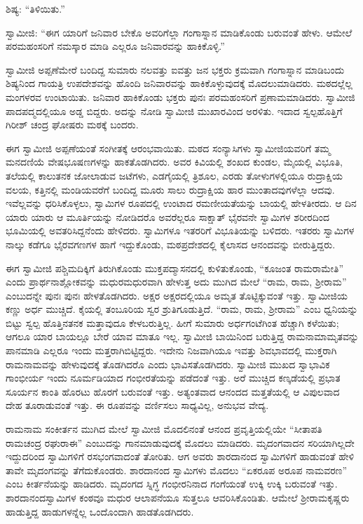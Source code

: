  ಶಿಷ್ಯ: “ತಿಳಿಯಿತು.” 

 ಸ್ವಾಮೀಜಿ: “ಈಗ ಯಾರಿಗೆ ಜನಿವಾರ ಬೇಕೊ ಅವರಿಗೆಲ್ಲಾ ಗಂಗಾಸ್ನಾನ ಮಾಡಿಕೊಂಡು ಬರುವಂತೆ ಹೇಳು. ಆಮೇಲೆ ಪರಮಹಂಸರಿಗೆ ನಮಸ್ಕಾರ ಮಾಡಿ ಎಲ್ಲರೂ ಜನಿವಾರವನ್ನು ಹಾಕಿಕೊಳ್ಳಿ.” 

 ಸ್ವಾಮೀಜಿ ಅಪ್ಪಣೆಮೇರೆ ಬಂದಿದ್ದ ಸುಮಾರು ನಲವತ್ತು ಐವತ್ತು ಜನ ಭಕ್ತರು ಕ್ರಮವಾಗಿ ಗಂಗಾಸ್ನಾನ ಮಾಡಿಬಂದು ಶಿಷ್ಯನಿಂದ ಗಾಯತ್ರಿ ಉಪದೇಶವನ್ನು ಹೊಂದಿ ಜನಿವಾರವನ್ನು ಹಾಕಿಕೊಳ್ಳುವುದಕ್ಕೆ ಮೊದಲುಮಾಡಿದರು. ಮಠದಲ್ಲೆಲ್ಲ ಮಂಗಳರವ ಉಂಟಾಯಿತು. ಜನಿವಾರ ಹಾಕಿಕೊಂಡು ಭಕ್ತರು ಪುನಃ ಪರಮಹಂಸರಿಗೆ ಪ್ರಣಾಮಮಾಡಿದರು. ಸ್ವಾಮೀಜಿ ಪಾದಪದ್ಮದಲ್ಲಿಯೂ ಅಡ್ಡ ಬಿದ್ದರು. ಅದನ್ನು ನೋಡಿ ಸ್ವಾಮೀಜಿ ಮುಖಾರವಿಂದ ಅರಳಿತು. ಇದಾದ ಸ್ವಲ್ಪಹೊತ್ತಿಗೆ ಗಿರೀಶ್ ಚಂದ್ರ ಘೋಷರು ಮಠಕ್ಕೆ ಬಂದರು. 

 ಈಗ ಸ್ವಾಮೀಜಿ ಅಪ್ಪಣೆಯಂತೆ ಸಂಗೀತಕ್ಕೆ ಆರಂಭವಾಯಿತು. ಮಠದ ಸಂನ್ಯಾಸಿಗಳು ಸ್ವಾಮೀಜಿಯವರಿಗೆ ತಮ್ಮ ಮನದಣಿಯೆ ವೇಷಭೂಷಣಗಳನ್ನು ಹಾಕತೊಡಗಿದರು. ಅವರ ಕಿವಿಯಲ್ಲಿ ಶಂಖದ ಕುಂಡಲ, ಮೈಯಲ್ಲಿ ವಿಭೂತಿ, ತಲೆಯಲ್ಲಿ ಕಾಲುತನಕ ಜೋಲಾಡುವ ಜಟೆಗಳು, ಎಡಗೈಯಲ್ಲಿ ತ್ರಿಶೂಲ, ಎರಡು ತೋಳುಗಳಲ್ಲಿಯೂ ರುದ್ರಾಕ್ಷಿಯ ವಲಯ, ಕತ್ತಿನಲ್ಲಿ ಮಂಡಿಯವರೆಗೆ ಬಂದಿದ್ದ ಮೂರು ಸಾಲು ರುದ್ರಾಕ್ಷಿಯ ಹಾರ ಮುಂತಾದವುಗಳೆಲ್ಲಾ ಆದವು. ಇವೆಲ್ಲವನ್ನು ಧರಿಸಿಕೊಳ್ಳಲು, ಸ್ವಾಮಿಗಳ ರೂಪದಲ್ಲಿ ಉಂಟಾದ ರಮಣೀಯತೆಯನ್ನು ಬಾಯಲ್ಲಿ ಹೇಳತೀರದು. ಆ ದಿನ ಯಾರು ಯಾರು ಆ ಮೂರ್ತಿಯನ್ನು ನೋಡಿದರೊ ಅವರೆಲ್ಲರೂ ಸಾಕ್ಷಾತ್ ಭೈರವನೇ‌ ಸ್ವಾಮಿಗಳ ಶರೀರದಿಂದ ಭೂಮಿಯಲ್ಲಿ ಅವತರಿಸಿದ್ದನೆಂದು ಹೇಳಿದರು. ಸ್ವಾಮಿಗಳೂ ಇತರರಿಗೆ ವಿಭೂತಿಯನ್ನು ಬಳಿದರು. ಇತರರು ಸ್ವಾಮಿಗಳ ನಾಲ್ಕು ಕಡೆಗೂ ಭೈರವಗಣಗಳ ಹಾಗೆ ಇದ್ದುಕೊಂಡು, ಮಠಪ್ರದೇಶದಲ್ಲಿ ಕೈಲಾಸದ ಆನಂದವನ್ನು ಬೀರುತ್ತಿದ್ದರು. 

 ಈಗ ಸ್ವಾಮೀಜಿ ಪಶ್ಚಿಮದಿಕ್ಕಿಗೆ ತಿರುಗಿಕೊಂಡು ಮುಕ್ತಪದ್ಮಾಸನದಲ್ಲಿ ಕುಳಿತುಕೊಂಡು, “ಕೂಜಂತ ರಾಮರಾಮೇತಿ” ಎಂದು ಪ್ರಾರ್ಥನಾಶ್ಲೋಕವನ್ನು ಮಧುರಮಧುರವಾಗಿ ಹೇಳುತ್ತ ಅದು ಮುಗಿದ ಮೇಲೆ “ರಾಮ, ರಾಮ, ಶ‍್ರೀರಾಮ” ಎಂಬುದನ್ನೇ ಪುನಃ ಪುನಃ ಹೇಳತೊಡಗಿದರು. ಅಕ್ಷರ ಅಕ್ಷರದಲ್ಲಿಯೂ ಅಮೃತ ತೊಟ್ಟಿಕ್ಕುವಂತೆ ಇತ್ತು. ಸ್ವಾಮೀಜಿಯ ಕಣ್ಣು ಅರ್ಧ ಮುಚ್ಚಿದೆ. ಕೈಯಲ್ಲಿ ತಂಬೂರಿಯ ಸ್ವರ ಶ್ರುತಿಗೂಡುತ್ತಿದೆ. “ರಾಮ, ರಾಮ, ಶ‍್ರೀರಾಮ” ಎಂಬ ಧ್ವನಿಯನ್ನು ಬಿಟ್ಟು ಸ್ವಲ್ಪ ಹೊತ್ತಿನತನಕ ಮತ್ತಾವುದೂ ಕೇಳಬರುತ್ತಿಲ್ಲ. ಹೀಗೆ ಸುಮಾರು ಅರ್ಧಗಂಟೆಗಿಂತ ಹೆಚ್ಚಾಗಿ ಕಳೆಯಿತು; ಆಗಲೂ ಯಾರ ಬಾಯಲ್ಲೂ ಬೇರೆ ಯಾವ ಮಾತೂ ಇಲ್ಲ. ಸ್ವಾಮೀಜಿ ಬಾಯಿನಿಂದ ಬರುತ್ತಿದ್ದ ರಾಮನಾಮಾಮೃತವನ್ನು ಪಾನಮಾಡಿ ಎಲ್ಲರೂ ಇಂದು ಮತ್ತರಾಗಿಬಿಟ್ಟಿದ್ದರು. ಇದೇನು ನಿಜವಾಗಿಯೂ ಇವತ್ತು ಶಿವಭಾವದಲ್ಲಿ ಮುಕ್ತರಾಗಿ ರಾಮನಾಮವನ್ನು ಹೇಳುವುದಕ್ಕೆ ತೊಡಗಿದರೊ ಎಂದು ಭಾವಿಸತೊಡಗಿದರು. ಸ್ವಾಮೀಜಿ ಮುಖದ ಸ್ವಾಭಾವಿಕ ಗಾಂಭೀರ್ಯ ಇಂದು ನೂರ್ಮಡಿಯಾದ ಗಂಭೀರತೆಯನ್ನು ಪಡೆದಂತೆ ಇತ್ತು. ಅರೆ ಮುಚ್ಚಿದ ಕಣ್ಕಡೆಯಲ್ಲಿ ಪ್ರಭಾತ ಸೂರ್ಯನ ಕಾಂತಿ ಹೊರಟು ಹೊರಗೆ ಬರುವಂತೆ ಇತ್ತು. ಅತ್ಯಂತವಾದ ಆನಂದದ ಮತ್ತತೆಯಲ್ಲಿ ಆ ವಿಪುಲವಾದ ದೇಹ ತೂರಾಡುವಂತೆ ಇತ್ತು. ಈ ರೂಪವನ್ನು ವರ್ಣಿಸಲು ಸಾಧ್ಯವಿಲ್ಲ, ಅನುಭವ ವೇದ್ಯ. 

 ರಾಮನಾಮ ಸಂಕೀರ್ತನ ಮುಗಿದ ಮೇಲೆ ಸ್ವಾಮೀಜಿ ಮೊದಲಿನಂತೆ ಆನಂದ ಪ್ರವೃತ್ತಿಯಲ್ಲಿಯೇ “ಸೀತಾಪತಿ ರಾಮಚಂದ್ರ ರಘುರಾಈ” ಎಂಬುದನ್ನು ಗಾನಮಾಡುವುದಕ್ಕೆ ಮೊದಲು ಮಾಡಿದರು. ಮೃದಂಗವಾದನ ಸರಿಯಾಗಿಲ್ಲದೇ ಇದ್ದುದರಿಂದ ಸ್ವಾಮಿಗಳಿಗೆ ರಸಭಂಗವಾದಂತೆ ತೋರಿತು. ಆಗ ಅವರು ಶಾರದಾನಂದ ಸ್ವಾಮಿಗಳಿಗೆ ಹಾಡುವಂತೆ ಹೇಳಿ ತಾವೇ ಮೃದಂಗವನ್ನು ತೆಗೆದುಕೊಂಡರು. ಶಾರದಾನಂದ ಸ್ವಾಮಿಗಳು ಮೊದಲು “ಏಕರೂಪ ಅರೂಪ ನಾಮವರಣ” ಎಂಬ ಕೀರ್ತನೆಯನ್ನು ಹಾಡಿದರು. ಮೃದಂಗದ ಸ್ನಿಗ್ಧ ಗಂಭೀರನಿನಾದ ಗಂಗೆಯಂತೆ ಉಕ್ಕಿ ಉಕ್ಕಿ ಬರುವಂತೆ ಇತ್ತು. ಶಾರದಾನಂದಸ್ವಾಮಿಗಳ ಕಂಠವೂ ಮಧುರ ಆಲಾಪನೆಯೂ ಸುತ್ತಲೂ ಆವರಿಸಿಕೊಂಡಿತು. ಆಮೇಲೆ ಶ‍್ರೀರಾಮಕೃಷ್ಣರು ಹಾಡುತ್ತಿದ್ದ ಹಾಡುಗಳನ್ನೆಲ್ಲ ಒಂದೊಂದಾಗಿ ಹಾಡತೊಡಗಿದರು. 

